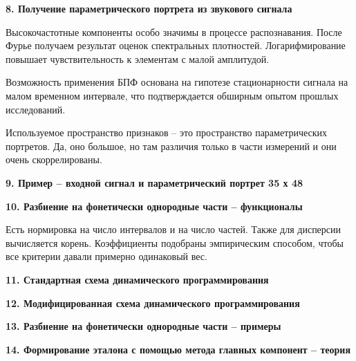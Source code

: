 \documentclass[a4paper, 12pt]{article}
\begin{document}
\begin{center}
	\textbf{\large 8. Получение параметрического портрета из звукового сигнала}
\end{center}	

Высокочастотные компоненты особо значимы в процессе распознавания. После Фурье получаем результат оценок спектральных плотностей. Логарифмирование повышает чувствительность к элементам с малой амплитудой.

Возможность применения БПФ основана на гипотезе стационарности сигнала на малом временном интервале, что подтверждается обширным опытом прошлых исследований.

Используемое пространство признаков – это пространство параметрических портретов. Да, оно большое, но там различия только в части измерений и они очень скоррелированы.



\begin{center}
	\textbf{\large 9. Пример – входной сигнал и параметрический портрет 35 х 48}
\end{center}	



\begin{center}
	\textbf{\large 10. Разбиение на фонетически однородные части – функционалы}
\end{center}	

Есть нормировка на число интервалов и на число частей. Также для дисперсии вычисляется корень. Коэффициенты подобраны эмпирическим способом, чтобы все критерии давали примерно одинаковый вес.



\begin{center}
	\textbf{\large 11. Стандартная схема динамического программирования}
\end{center}	



\begin{center}
	\textbf{\large 12. Модифицированная схема динамического программирования}
\end{center}	



\begin{center}
	\textbf{\large 13. Разбиение на фонетически однородные части – примеры}
\end{center}	



\begin{center}
	\textbf{\large 14. Формирование эталона с помощью метода главных компонент – теория}
\end{center}	
\end{document}
